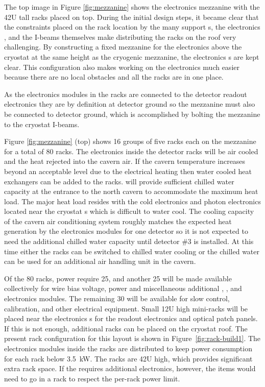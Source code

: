 The top image in Figure \ref{fig:mezzanine} shows the  electronics mezzanine with the 42U tall racks placed on top. 
During the initial design steps, it became clear that the constraints placed on the rack location by the many  support \fdth{}s, the electronics \fdth, and the I-beams themselves make distributing the racks on the roof very challenging. 
By constructing a fixed mezzanine for the electronics above the cryostat at the same height as the cryogenic mezzanine, the electronics \fdth{}s are kept clear. 
This configuration also makes working on the electronics much easier because there are no local obstacles and all the racks are in one place.

As the electronics modules in the  racks are connected to the detector readout electronics they are by definition at detector ground so the mezzanine must also be connected to detector ground, which is accomplished by bolting the mezzanine to the cryostat I-beams. 
 
Figure \ref{fig:mezzanine} (top) shows 16 groups of five racks each
on the mezzanine for a total of 80 racks. 
The electronics inside the detector racks will be air cooled and the heat rejected into the cavern air. 
If the cavern temperature increases beyond an acceptable level due to the electrical heating then water cooled heat exchangers can be added to the racks.  will provide sufficient chilled water capacity at the entrance to the north cavern to accommodate the maximum heat load. 
The major heat load resides with the cold electronics and photon electronics located near the cryostat \fdth{}s which is difficult to water cool. 
The cooling capacity of the cavern air conditioning system roughly matches the expected heat generation by the electronics modules for one detector so it is not expected to need the additional chilled water capacity until detector \#3 is installed. 
At this time either the racks can be switched to chilled water cooling or the chilled water can be used for an additional air handling unit in the cavern.


Of the 80 racks,   power require \num{25}, and another 25 will be made available collectively for   wire bias voltage,  power and miscellaneous additional , , and   electronics modules. 
The remaining 30 will be available for slow control, calibration, and other electrical equipment. 
Small 12U high mini-racks will  be placed near the electronics \fdth{}s for the  readout electronics and optical patch panels. If this is not enough, additional racks can be placed on the cryostat roof. The present rack configuration for this layout is shown in Figure~\ref{fig:rack-build1}. 
The electronics modules inside the racks are distributed to keep power consumption for each rack below \SI{3.5}{kW}. 
The racks are 42U high, which provides significant extra rack space.  If the  requires additional electronics, however, the items would need to go in a  rack to respect the per-rack power limit.

